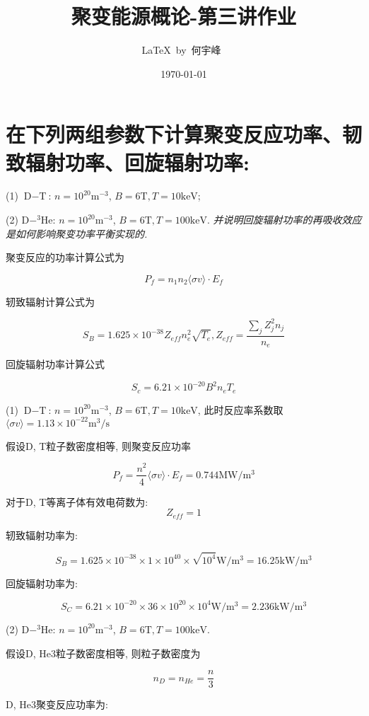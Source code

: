 \documentclass{article}
\title{聚变能源概论-第三讲作业}
\author{\LaTeX\ by\ 何宇峰\ }
\date{\today}
\begin{document}
\pagestyle{fancy}

\fancyhead[R]{\today}

\section*{在下列两组参数下计算聚变反应功率、韧致辐射功率、回旋辐射功率:}

(1) $\text{D}-\text{T}$: $n = 10^{20} \text{m}^{-3}$, $B = 6 \text{T}, T = 10 \text{keV}$;

(2) $\text{D}-^3\text{He}$: $n = 10^{20} \text{m}^{-3}$, $B = 6 \text{T}, T = 100 \text{keV}$. \emph{并说明回旋辐射功率的再吸收效应是如何影响聚变功率平衡实现的.}

聚变反应的功率计算公式为

$$P_f = n_1 n_2 \langle \sigma v \rangle \cdot E_f$$

轫致辐射计算公式为

$$S_B = 1.625 \times 10^{-38} Z_{eff} n_e^2\sqrt{T_e}, Z_{eff} = \frac{\sum_j Z_j^2n_j}{n_e}$$

回旋辐射功率计算公式

$$S_c = 6.21 \times 10^{-20} B^2n_eT_e$$

(1) $\text{D}-\text{T}$: $n = 10^{20} \text{m}^{-3}$, $B = 6 \text{T}, T = 10 \text{keV}$, 此时反应率系数取$\langle \sigma v \rangle = 1.13 \times 10^{-22} \text{m}^3/\text{s}$

假设D, T粒子数密度相等, 则聚变反应功率

$$P_f = \frac{n^2}{4} \langle \sigma v \rangle \cdot E_f = 0.744 \text{MW}/\text{m}^3$$

对于D, T等离子体有效电荷数为: $$Z_{eff} = 1$$

轫致辐射功率为:

$$S_B = 1.625 \times 10^{-38} \times 1 \times 10^{40} \times \sqrt{10^4}\text{W}/\text{m}^3 = 16.25 \text{kW}/\text{m}^3$$

回旋辐射功率为:

$$S_C = 6.21 \times 10^{-20} \times 36 \times 10^{20} \times 10^4\text{W}/\text{m}^3 = 2.236 \text{kW}/\text{m}^3$$

(2) $\text{D}-^3\text{He}$: $n = 10^{20} \text{m}^{-3}$, $B = 6 \text{T}, T = 100 \text{keV}$.

假设D, He3粒子数密度相等, 则粒子数密度为

$$n_D = n_{He} = \frac{n}{3}$$

D, He3聚变反应功率为:
\end{document}
